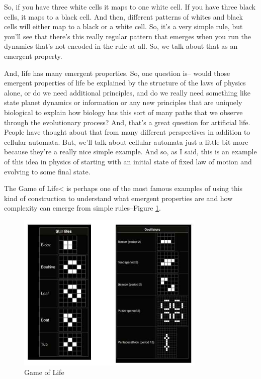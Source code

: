 \documentclass[]{article}
\begin{document}
So, if you have three white cells
it maps to one white cell.
If you have three black cells,
it maps to a black cell.
And then, different patterns
of whites and black cells
will either map to a black
or a white cell.
So, it's a very simple rule,
but you'll see that there's this
really regular pattern that emerges
when you run the dynamics
that's not encoded in the rule at all.
So, we talk about that
as an emergent property.


And, life has many emergent properties.
So, one question is--
would those emergent properties of life
be explained by the structure
of the laws of physics alone,
or do we need additional principles,
and do we really need something
like state planet dynamics
or information
or any new principles
that are uniquely biological
to explain how biology has
this sort of many paths
that we observe
through the evolutionary process?
And, that's a great question
for artificial life.
People have thought about that
from many different perspectives
in addition to cellular automata.
But, we'll talk about cellular automata
just a little bit more
because they're a really
nice simple example.
And so, as I said,
this is an example of this idea in physics
of starting with an initial state
of fixed law of motion
and evolving to some final state.

The Game of Life< is perhaps
one of the most famous examples
of using this kind of construction
to understand
what emergent properties are
and how complexity can emerge
from simple rules--Figure \ref{fig:GameOfLife}.

\begin{figure}[H]
	\caption[Game of Life]{Game of Life\cite{wiki:game:life}}\label{fig:GameOfLife}
	\includegraphics[width=0.8\textwidth]{GameOfLife}
\end{figure}
\end{document}
